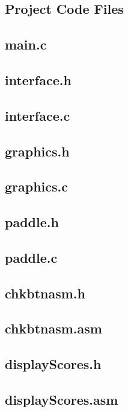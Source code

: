 \documentclass[12pt]{enscStyle}
\renewcommand{\baselinestretch}{1.5}
\begin{document}


%
%




%


\newcommand{\codefile}[2]{
	\section{#1}
	\label{code:#1}
	{\scriptsize}
}

\newcommand{\codesection}[3]{
	\cleardoublepage
	\codefile{#1.h}{#2}
	\codefile{#1.#3}{#2}
}

\begin{appendix}
\renewcommand{\baselinestretch}{1.0}

\chapter{Project Code Files}
\label{ch:code}

\codefile{main.c}{C}

\codesection{interface}{C}{c}

\codesection{graphics}{C}{c}

\codesection{paddle}{C}{c}

\codesection{chkbtnasm}{}{asm}

\codesection{displayScores}{}{asm}
\end{appendix}
\end{document}

